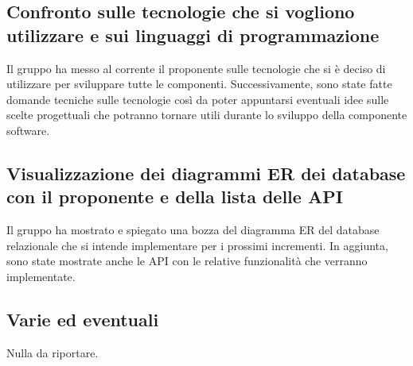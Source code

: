 	\subsection*{Confronto sulle tecnologie che si vogliono utilizzare e sui linguaggi di programmazione}
		Il gruppo ha messo al corrente il proponente sulle tecnologie che si è deciso di utilizzare per sviluppare tutte le componenti. Successivamente, sono state fatte domande tecniche sulle tecnologie così da poter appuntarsi eventuali idee sulle scelte progettuali che potranno tornare utili durante lo sviluppo della componente software.

	\subsection*{Visualizzazione dei diagrammi ER dei database con il proponente e della lista delle API}
		Il gruppo ha mostrato e spiegato una bozza del diagramma ER del database relazionale che si intende implementare per i prossimi incrementi. In aggiunta, sono state mostrate anche le API con le relative funzionalità che verranno implementate.

	\subsection*{Varie ed eventuali}
		Nulla da riportare.
